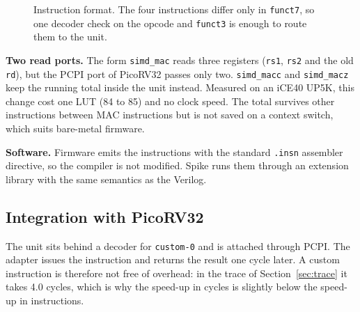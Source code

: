 \documentclass[10pt,a4paper]{article}
\newcommand{\simd}[1]{\texttt{simd\_#1}}
\begin{document}
\begin{figure}[htbp]
\centering
{}
\caption{Instruction format. The four instructions differ only in \texttt{funct7}, so one decoder check on the opcode and \texttt{funct3} is enough to route them to the unit.}
\label{fig:encoding}
\end{figure}

\textbf{Two read ports.} The form \simd{mac} reads three registers (\texttt{rs1}, \texttt{rs2} and the old \texttt{rd}), but the PCPI port of PicoRV32 passes only two. \simd{macc} and \simd{macz} keep the running total inside the unit instead. Measured on an iCE40 UP5K, this change cost one LUT (84 to 85) and no clock speed. The total survives other instructions between MAC instructions but is not saved on a context switch, which suits bare-metal firmware.

\textbf{Software.} Firmware emits the instructions with the standard \texttt{.insn} assembler directive, so the compiler is not modified. Spike runs them through an extension library with the same semantics as the Verilog.

\subsection{Integration with PicoRV32}
The unit sits behind a decoder for \texttt{custom-0} and is attached through PCPI. The adapter issues the instruction and returns the result one cycle later. A custom instruction is therefore not free of overhead: in the trace of Section~\ref{sec:trace} it takes 4.0 cycles, which is why the speed-up in cycles is slightly below the speed-up in instructions.
\end{document}
